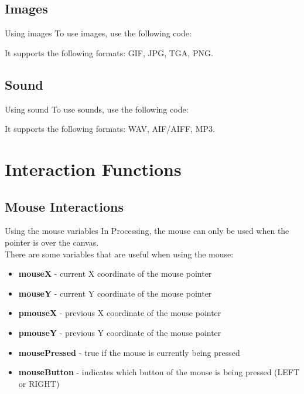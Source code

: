 \documentclass{beamer}
\begin{document}
\subsection{Images}

\begin{frame}{Using images}
To use images, use the following code:\\

\lstImages

It supports the following formats: GIF, JPG, TGA, PNG.
\end{frame}

\subsection{Sound}

\begin{frame}{Using sound}
To use sounds, use the following code:\\

\lstSounds

It supports the following formats: WAV, AIF/AIFF, MP3.
\end{frame}

\section{Interaction Functions}

\subsection{Mouse Interactions}

\begin{frame}{Using the mouse variables}
In Processing, the mouse can only be used when the pointer
is over the canvas.\\
There are some variables that are useful when using the mouse:

\begin{itemize}
\item{\textbf{mouseX} - current X coordinate of the mouse pointer}
\item{\textbf{mouseY} - current Y coordinate of the mouse pointer}
\item{\textbf{pmouseX} - previous X coordinate of the mouse pointer}
\item{\textbf{pmouseY} - previous Y coordinate of the mouse pointer}
\item{\textbf{mousePressed} - true if the mouse is currently being pressed}
\item{\textbf{mouseButton} - indicates which button of the mouse is being pressed (LEFT or RIGHT)}
\end{itemize}
\end{frame}
\end{document}
